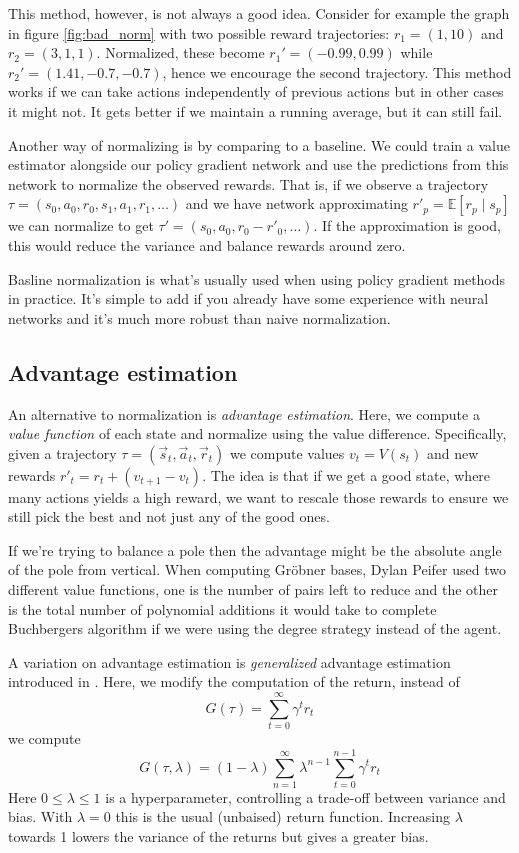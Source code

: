 \documentclass{article}
\theoremstyle{changedot}
\theoremstyle{changedotbreak}
\theoremstyle{nonumberplain}
\newcommand{\m}{\mathbb}
\begin{document}
This method, however, is not always a good idea. Consider for example the graph in figure \ref{fig:bad_norm} with two possible reward trajectories: $r_{1} = (1, 10)$ and $r_{2} = (3, 1, 1)$. Normalized, these become $r_{1}' = (-0.99, 0.99)$ while $r_{2}' = (1.41, -0.7, -0.7)$, hence we encourage the second trajectory. This method works if we can take actions independently of previous actions but in other cases it might not. It gets better if we maintain a running average, but it can still fail.

Another way of normalizing is by comparing to a baseline. We could train a value estimator alongside our policy gradient network and use the predictions from this network to normalize the observed rewards. That is, if we observe a trajectory $\tau = (s_{0}, a_{0}, r_{0}, s_{1}, a_{1}, r_{1}, \dots)$ and we have network approximating $r'_{p} = \m E[r_{p} \mid s_{p}]$ we can normalize to get $\tau' = (s_{0}, a_{0}, r_{0} - r'_{0}, \dots)$. If the approximation is good, this would reduce the variance and balance rewards around zero.

Basline normalization is what's usually used when using policy gradient methods in practice. It's simple to add if you already have some experience with neural networks and it's much more robust than naive normalization.


\subsection{Advantage estimation}
An alternative to normalization is \emph{advantage estimation}. Here, we compute a \emph{value function} of each state and normalize using the value difference. Specifically, given a trajectory $\tau = (\overrightarrow s_{t}, \overrightarrow a_{t}, \overrightarrow r_{t})$ we compute values $v_{t} = V(s_{t})$ and new rewards $r'_{t} = r_{t} + (v_{t+1} - v_{t})$. The idea is that if we get a good state, where many actions yields a high reward, we want to rescale those rewards to ensure we still pick the best and not just any of the good ones.

If we're trying to balance a pole then the advantage might be the absolute angle of the pole from vertical. When computing Gröbner bases, Dylan Peifer used two different value functions, one is the number of pairs left to reduce and the other is the total number of polynomial additions it would take to complete Buchbergers algorithm if we were using the degree strategy instead of the agent. 

A variation on advantage estimation is \emph{generalized} advantage estimation introduced in \cite{GAE}. Here, we modify the computation of the return, instead of \[G(\tau) = \sum_{t=0}^{\infty} \gamma^{t} r_{t}\] we compute \[G(\tau, \lambda) = (1 - \lambda)\sum_{n=1}^{\infty} \lambda^{n-1} \sum_{t=0}^{n-1} \gamma^{t} r_{t}\] Here $0 \leq \lambda \leq 1$ is a hyperparameter, controlling a trade-off between variance and bias. With $\lambda = 0$ this is the usual (unbaised) return function. Increasing $\lambda$ towards 1 lowers the variance of the returns but gives a greater bias.
\end{document}
